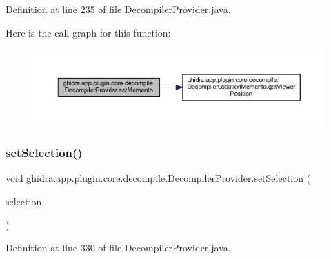 Definition at line 235 of file Decompiler\+Provider.\+java.

Here is the call graph for this function\+:
\nopagebreak
\begin{figure}[H]
\begin{center}
\leavevmode
\includegraphics[width=350pt]{classghidra_1_1app_1_1plugin_1_1core_1_1decompile_1_1_decompiler_provider_a87f073c9afbb251f2ee4e6dfbb8b4884_cgraph}
\end{center}
\end{figure}
\mbox{\label{classghidra_1_1app_1_1plugin_1_1core_1_1decompile_1_1_decompiler_provider_a8f71722592aba9ce781d418d25aa8f3c}} 
\subsubsection{\texorpdfstring{setSelection()}{setSelection()}}
{\footnotesize\ttfamily void ghidra.\+app.\+plugin.\+core.\+decompile.\+Decompiler\+Provider.\+set\+Selection (\begin{DoxyParamCaption}\item[{Program\+Selection}]{selection }\end{DoxyParamCaption})\hspace{0.3cm}{\ttfamily [inline]}}



Definition at line 330 of file Decompiler\+Provider.\+java.

